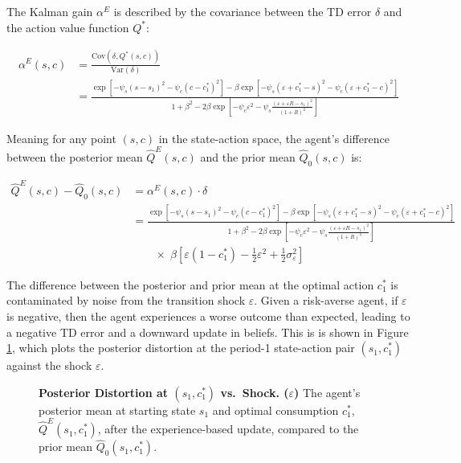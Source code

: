 The Kalman gain $\alpha^E$ is described by the covariance between the TD error $\delta$ 
and the action value function $Q^*$:

\begin{align*}
  \alpha^E(s,c) &= \frac{
    \text{Cov}(\delta, Q^*(s,c))
  }{
    \text{Var}(\delta)
  } \\[8pt]
  &= \frac{
    \exp\left[
      -\psi_s(s - s_1)^2
      - \psi_c(c - c_1^*)^2
    \right]
    - \beta \exp\left[
      -\psi_s(\varepsilon + c_1^* - s)^2
      - \psi_c(\varepsilon + c_1^* - c)^2
    \right]
  }{
    1 + \beta^2
    - 2\beta \exp\left[
      -\psi_c \varepsilon^2
      - \psi_s \frac{
        (\varepsilon + \varepsilon R - s_1)^2
      }{(1+R)^2}
    \right]
  }
\end{align*}

Meaning for any point $(s,c)$ in the state-action space, the agent's difference 
between the posterior mean $\hat{Q}^E(s,c)$ and the prior mean $\hat{Q}_0(s,c)$ is:

\begin{align*}
  \hat{Q}^E(s,c) - \hat{Q}_0(s,c)
  &= \alpha^E(s,c) \cdot \delta \\[10pt]
  &= \frac{
    \exp\left[
      -\psi_s(s - s_1)^2
      - \psi_c(c - c_1^*)^2
    \right]
    - \beta \exp\left[
      -\psi_s(\varepsilon + c_1^* - s)^2
      - \psi_c(\varepsilon + c_1^* - c)^2
    \right]
  }{
    1 + \beta^2
    - 2\beta \exp\left[
      -\psi_c \varepsilon^2
      - \psi_s \frac{
        (\varepsilon + \varepsilon R - s_1)^2
      }{(1+R)^2}
    \right]
  } \\
  &\qquad \times \;
    \beta \left[\varepsilon (1 - c_1^*) - \tfrac{1}{2}\varepsilon^2 + \tfrac{1}{2}\sigma_\varepsilon^2\right]
\end{align*}

The difference between the posterior and prior mean at the optimal action $c_1^*$ is
contaminated by noise from the transition shock $\varepsilon$. Given a risk-averse agent, 
if $\varepsilon$ is negative, then the agent experiences a worse outcome than expected, leading to a 
negative TD error and a downward update in beliefs. This is is shown in Figure \ref{fig:update_vs_eps},
which plots the posterior distortion at the period-1 state-action pair $(s_1, c_1^*)$ against the shock $\varepsilon$. 

\begin{figure} \label{fig:update_vs_eps}
\centering
\resizebox{\textwidth}{!}{
  
}
\caption[Posterior Distortion]{
  \textbf{Posterior Distortion at $(s_1, c_1^*)$
  vs.\ Shock. ($\varepsilon$)}
The agent's posterior mean at starting state $s_1$ and optimal consumption $c_1^*$, $\hat{Q}^E(s_1,c_1^*)$, after the experience-based update, compared to the prior mean $\hat{Q}_0(s_1,c_1^*)$.}
\end{figure}

